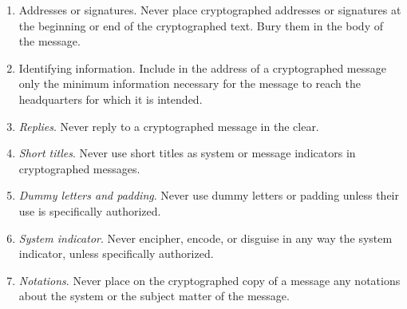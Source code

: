 \begin{enumerate}
\item Addresses or signatures. Never place cryptographed addresses
or signatures at the beginning or end of the cryptographed text.
Bury them in the body of the message.

\item Identifying information. Include in the address of a cryptographed message only the minimum information necessary for
the message to reach the headquarters for which it is intended.

\item \textit{Replies}. Never reply to a cryptographed message in the clear.

\item \textit{Short titles}. Never use short titles as system or message indicators in cryptographed messages.

\item \textit{Dummy letters and padding}. Never use dummy letters or padding unless their use is speciﬁcally authorized.

\item \textit{System indicator}. Never encipher, encode, or disguise in any
way the system indicator, unless speciﬁcally authorized.

\item \textit{Notations}. Never place on the cryptographed copy of a
message any notations about the system or the subject matter
of the message.


\end{enumerate}

